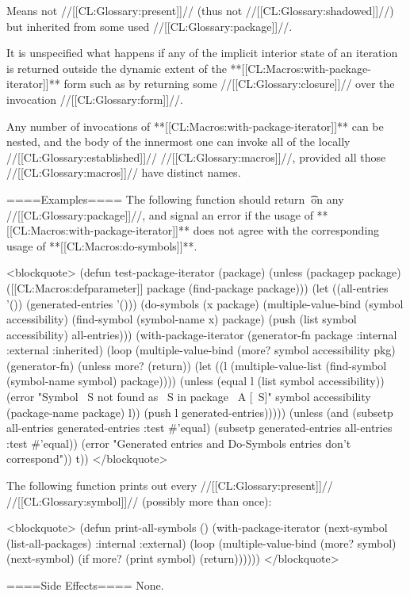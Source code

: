 Means not //[[CL:Glossary:present]]// (thus not //[[CL:Glossary:shadowed]]//) but inherited from some used //[[CL:Glossary:package]]//. \endlist

It is unspecified what happens if any of the implicit interior state of an iteration is returned outside the dynamic extent of the **[[CL:Macros:with-package-iterator]]** form such as by returning some //[[CL:Glossary:closure]]// over the invocation //[[CL:Glossary:form]]//.

Any number of invocations of **[[CL:Macros:with-package-iterator]]** can be nested, and the body of the innermost one can invoke all of the locally //[[CL:Glossary:established]]// //[[CL:Glossary:macros]]//, provided all those //[[CL:Glossary:macros]]// have distinct names.

====Examples====
The following function should return \t\ on any //[[CL:Glossary:package]]//, and signal an error if the usage of **[[CL:Macros:with-package-iterator]]** does not agree with the corresponding usage of **[[CL:Macros:do-symbols]]**.

<blockquote> (defun test-package-iterator (package) (unless (packagep package) ([[CL:Macros:defparameter]] package (find-package package))) (let ((all-entries '()) (generated-entries '())) (do-symbols (x package) (multiple-value-bind (symbol accessibility) (find-symbol (symbol-name x) package) (push (list symbol accessibility) all-entries))) (with-package-iterator (generator-fn package :internal :external :inherited) (loop (multiple-value-bind (more? symbol accessibility pkg) (generator-fn) (unless more? (return)) (let ((l (multiple-value-list (find-symbol (symbol-name symbol) package)))) (unless (equal l (list symbol accessibility)) (error "Symbol ~S not found as ~S in package ~A [~S]" symbol accessibility (package-name package) l)) (push l generated-entries))))) (unless (and (subsetp all-entries generated-entries :test #'equal) (subsetp generated-entries all-entries :test #'equal)) (error "Generated entries and Do-Symbols entries don't correspond")) t)) </blockquote>

The following function prints out every //[[CL:Glossary:present]]// //[[CL:Glossary:symbol]]// (possibly more than once):

<blockquote> (defun print-all-symbols () (with-package-iterator (next-symbol (list-all-packages) :internal :external) (loop (multiple-value-bind (more? symbol) (next-symbol) (if more? (print symbol) (return)))))) </blockquote>

====Side Effects====
None.

